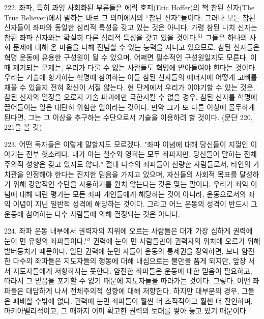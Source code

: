 \documentclass[11pt,a4paper]{article}
\begin{document}
\begin{multicols}{2}
222. 좌파, 특히 과잉 사회화된 부류들은 에릭 호퍼(Eric Hoffer)의 책 \textlangle{}참된 신자(The True Believer)\textrangle{}에서 말하는 바로 그 의미에서의 “참된 신자”들이다. 그러나 모든 참된 신자들이 좌파와 동일한 심리적  특성을 갖고 있는 것은 아니다. 가령 참된 나치 신자는 참된 좌파 신자와는 확실히 다른 심리적 특성을  갖고 있을 것이다.\hyperlink{61}{$^{61}$} 그들은 하나의 사회 문제에 대해 온 마음을 다해 전념할 수 있는 능력을 지니고  있으므로, 참된 신자들은 혁명 운동에 유용한 구성원이 될 수 있으며, 어쩌면 필수적인 구성원일지도  모른다. 이때 제기되는 문제는, 우리가 다룰 수 없는 사람들도 혁명에 받아들여야 한다는 것이다. 우리는  기술에 항거하는 혁명에 참여하는 이들 참된 신자들의 에너지에 어떻게 고삐를 채울 수 있을지 전혀 확신이 서질 않는다. 현 단계에서 우리가 이야기할 수 있는 것은, 참된 신자의 열정을 오로지 기술  파괴에만 국한시킬 수 없을 경우, 참된 신자를 혁명에 끌어들이는 일은 대단히 위험한 일이라는 것이다.  만약 그가 또 다른 이상에 몰두하게 된다면, 그는 그 이상을 추구하는 수단으로서 기술을 이용하려 할  것이다. (문단 220, 221을 볼 것) 


223. 어떤 독자들은 이렇게 말할지도 모르겠다. "좌파 이념에 대해 당신들이 지껄인 이야기는 전부 헛소리다. 내가 아는 철수와 영희는 모두 좌파지만, 당신들이 말하는 전체주의적 성향은 갖고 있지도  않다." 절대 다수의 좌파들이 선량한 사람들로서, 타인의 가치관을 인정해야 한다는 진지한 믿음을  가지고 있으며, 자신들의 사회적 목표를 달성하기 위해 강압적인 수단을 사용하기를 원치 않는다는 것은  맞는 말이다. 우리가 좌익 이념에 대해 내린 평가는 모든 좌파 개인들에게 해당하는 것이 아니라,  운동으로서의 좌익 이념이 지닌 일반적 성격에 해당하는 것이다. 그리고 어느 운동의 성격이 반드시 그  운동에 참여하는 다수 사람들에 의해 결정되는 것은 아니다.  


224. 좌파 운동 내부에서 권력자의 지위에 오르는 사람들은 대개 가장 심하게 권력에 눈이 먼 유형의  좌파들이다.\hyperlink{62}{$^{62}$} 권력에 눈이 먼 사람들만이 권력자의 위치에 오르기 위해 발버둥치기 때문이다. 일단 권력에 눈먼 자들이 운동의 통제권을 장악하면, 보다 얌전한 다수의 좌파들은 지도자들의 행동에 대해  내심으로는 불만을 품게 되지만, 앞장 서서 지도자들에게 저항하지는 못한다. 얌전한 좌파들은 운동에  대한 믿음이 필요하고, 따라서 그 믿음을 포기할 수 없기 때문에 지도자들을 따라가는 것이다. 그렇다.  어떤 좌파들은 대담하게 나서 전체주의적 성향에 대해 저항한다. 하지만 대부분의 경우, 그들은 패배할  수밖에 없다. 권력에 눈먼 좌파들이 훨씬 더 조직적이고 훨씬 더 잔인하며, 마키아벨리적이고, 그 때까지  이미 확고한 권력의 토대를 쌓아 놓고 있기 때문이다.  



\end{multicols}
\end{document}
